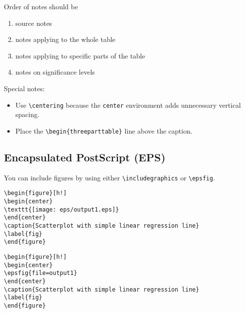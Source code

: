 Order of notes should be
\vspace{-.08in}
\begin{enumerate}
\item source notes
\item notes applying to the whole table
\item notes applying to specific parts of the table
\item notes on significance levels
\end{enumerate}

Special notes:

\vspace{-.08in}
\begin{itemize}
\item Use \verb+\centering+ because the {\tt center} environment adds
unnecessary vertical spacing.

\item Place the \verb+\begin{threeparttable}+ line above the caption.

\end{itemize}


\subsection{Encapsulated PostScript (EPS)}

You can include figures by using either \verb+\includegraphics+ or
\verb+\epsfig+.

\begin{stverbatim}
\begin{verbatim}
\begin{figure}[h!]
\begin{center}
\texttt{[image: eps/output1.eps]}
\end{center}
\caption{Scatterplot with simple linear regression line}
\label{fig}
\end{figure}
\end{verbatim}
\end{stverbatim}

\begin{stverbatim}
\begin{verbatim}
\begin{figure}[h!]
\begin{center}
\epsfig{file=output1}
\end{center}
\caption{Scatterplot with simple linear regression line}
\label{fig}
\end{figure}
\end{verbatim}
\end{stverbatim}

